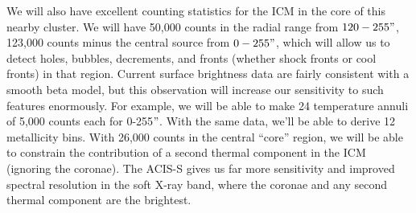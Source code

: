 \documentclass[letterpaper,11pt]{article}
\begin{document}
We will also have excellent counting statistics for the ICM in the
core of this nearby cluster. We will have 50,000 counts in the radial
range from $120-255"$, 123,000 counts minus the central source from
$0-255"$, which will allow us to detect holes, bubbles, decrements,
and fronts (whether shock fronts or cool fronts) in that
region. Current surface brightness data are fairly consistent with a
smooth beta model, but this observation will increase our sensitivity
to such features enormously. For example, we will be able to make 24
temperature annuli of 5,000 counts each for 0-255$"$. With the same
data, we'll be able to derive 12 metallicity bins. With 26,000 counts
in the central ``core'' region, we will be able to constrain the
contribution of a second thermal component in the ICM (ignoring the
coronae). The ACIS-S gives us far more sensitivity and improved
spectral resolution in the soft X-ray band, where the coronae and any
second thermal component are the brightest.
\end{document}
